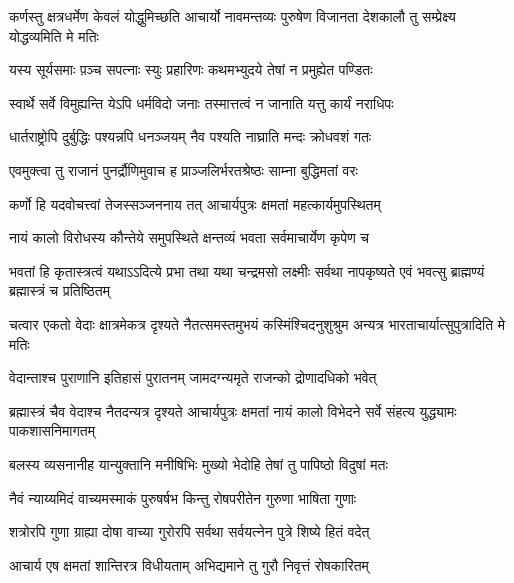 \threelineshloka
{कर्णस्तु क्षत्रधर्मेण केवलं योद्धुमिच्छति}
{आचार्यो नावमन्तव्यः पुरुषेण विजानता}
{देशकालौ तु सम्प्रेक्ष्य योद्धव्यमिति मे मतिः}


\twolineshloka
{यस्य सूर्यसमाः प़ञ्च सपत्नाः स्युः प्रहारिणः}
{कथमभ्युदये तेषां न प्रमुह्येत पण्डितः}


\twolineshloka
{स्वार्थे सर्वे विमुह्यन्ति येऽपि धर्मविदो जनाः}
{तस्मात्तत्वं न जानाति यत्तु कार्यं नराधिपः}


\twolineshloka
{धार्तराष्ट्रोपि दुर्बुद्धिः पश्यन्नपि धनञ्जयम्}
{नैव पश्यति नाघ्राति मन्दः क्रोधवशं गतः}



\twolineshloka
{एवमुक्त्वा तु राजानं पुनर्द्रौणिमुवाच ह}
{प्राञ्जलिर्भरतश्रेष्ठः साम्ना बुद्धिमतां वरः}


\twolineshloka
{कर्णो हि यदवोचत्त्वां तेजस्सञ्जननाय तत्}
{आचार्यपुत्रः क्षमतां महत्कार्यमुपस्थितम्}


\twolineshloka
{नायं कालो विरोधस्य कौन्तेये समुपस्थिते}
{क्षन्तव्यं भवता सर्वमाचार्येण कृपेण च}


\threelineshloka
{भवतां हि कृतास्त्रत्वं यथाऽऽदित्ये प्रभा तथा}
{यथा चन्द्रमसो लक्ष्मीः सर्वथा नापकृष्यते}
{एवं भवत्सु ब्राह्मण्यं ब्रह्मास्त्रं च प्रतिष्ठितम्}


\threelineshloka
{चत्वार एकतो वेदाः क्षात्रमेकत्र दृश्यते}
{नैतत्समस्तमुभयं कस्मिंश्चिदनुशुश्रुम}
{अन्यत्र भारताचार्यात्सुपुत्रादिति मे मतिः}


\twolineshloka
{वेदान्ताश्च पुराणानि इतिहासं पुरातनम्}
{जामदग्न्यमृते राजन्को द्रोणादधिको भवेत्}


\onelineshloka
{ब्रह्मास्त्रं चैव वेदाश्च नैतदन्यत्र दृश्यते}
\twolineshloka
{आचार्यपुत्रः क्षमतां नायं कालो विभेदने}
{सर्वे संहत्य युद्ध्यामः पाकशासनिमागतम्}


\twolineshloka
{बलस्य व्यसनानीह यान्युक्तानि मनीषिभिः}
{मुख्यो भेदोहि तेषां तु पापिष्ठो विदुषां मतः}




\twolineshloka
{नैवं न्याय्यमिदं वाच्यमस्माकं पुरुषर्षभ}
{किन्तु रोषपरीतेन गुरुणा भाषिता गुणाः}


\twolineshloka
{शत्रोरपि गुणा ग्राह्या दोषा वाच्या गुरोरपि}
{सर्वथा सर्वयत्नेन पुत्रे शिष्ये हितं वदेत्}


\twolineshloka
{आचार्य एष क्षमतां शान्तिरत्र विधीयताम्}
{अभिद्यमाने तु गुरौ निवृत्तं रोषकारितम्}



